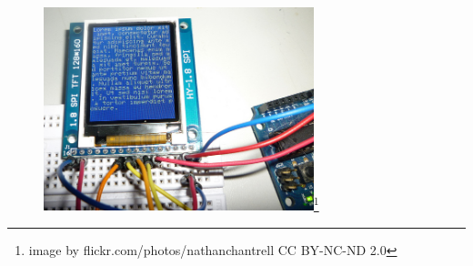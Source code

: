 \documentclass{beamer}
\begin{document}
\begin{frame}
	\begin{figure}[ht]
		\centering
		\includegraphics[width=0.7\textwidth]{img/SPI_TFT_LCD_BY_flickr_nathanchantrell.jpg}\footnote{image by flickr.com/photos/nathanchantrell CC BY-NC-ND 2.0} 
	\end{figure}
\end{frame}
\end{document}
